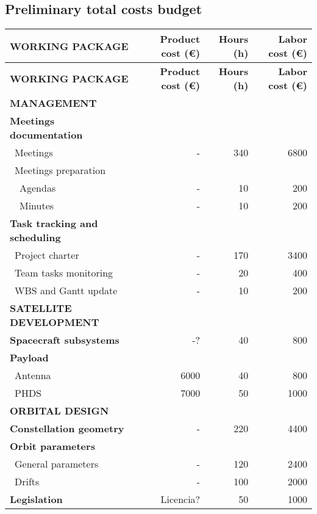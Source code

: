 \pagebreak

\subsection{Preliminary total costs budget}
\begin{longtable}{| l | r | r |r | }
	\hline
\rowcolor[gray]{0.65}	\textbf{WORKING PACKAGE} &\textbf{Product cost (\euro)}& \textbf{Hours (h)}     &  \textbf{Labor cost (\euro)}   \\
    \hline
    \endfirsthead

	\hline
\rowcolor[gray]{0.65}	\textbf{WORKING PACKAGE} &\textbf{Product cost (\euro)}& \textbf{Hours (h)}     &  \textbf{Labor cost (\euro)}   \\
    \hline
    \endhead

\rowcolor[gray]{0.85} \textbf{MANAGEMENT} & &  &  \\

   \textbf{Meetings documentation} & & & \\
	   \blue ~Meetings & - & 340  & 6800  \\
	   \blue ~Meetings preparation & & &   \\
	   ~~Agendas & - & 10 & 200 \\
	   ~~Minutes & - & 10 & 200 \\
	\hline
	\textbf{Task tracking and scheduling} & & & \\
	   \blue ~Project charter & - & 170 & 3400  \\
	   \blue ~Team tasks monitoring & - & 20 & 400  \\
	   \blue ~WBS and Gantt update & - & 10 & 200 \\

\rowcolor[gray]{0.85}	\textbf{SATELLITE DEVELOPMENT} & &  &   \\
	
	\textbf{Spacecraft subsystems} & -? & 40 & 800  \\
	\hline
	\textbf{Payload} & & &  \\
	   \blue ~Antenna & 6000 & 40  & 800  \\
	   \blue ~PHDS & 7000 & 50  & 1000  \\

\rowcolor[gray]{0.85}	\textbf{ORBITAL DESIGN} & &  & \\

	\textbf{Constellation geometry} & - & 220  & 4400  \\
	\hline
	\textbf{Orbit parameters} & &   &  \\
	   \blue ~General parameters & - & 120 & 2400 \\
	   \blue ~Drifts & - & 100  & 2000  \\
	\hline
	\textbf{Legislation} & Licencia? & 50 & 1000 \\
   

\end{longtable}
